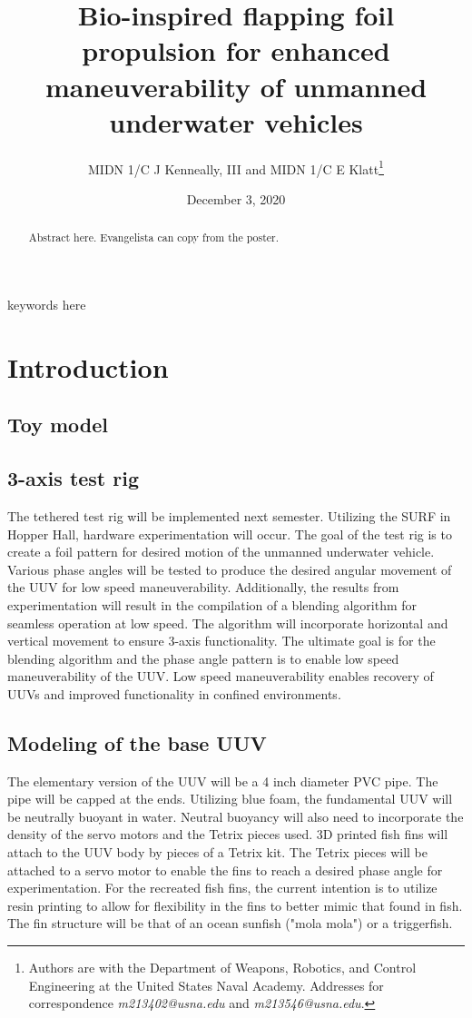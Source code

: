 \documentclass[twocolumn,10pt]{IEEEtran}
\title{Bio-inspired flapping foil propulsion for enhanced maneuverability of unmanned underwater vehicles}
\author{MIDN 1/C J Kenneally, III and MIDN 1/C E Klatt\thanks{Authors are with the Department of Weapons, Robotics, and Control Engineering at the United States Naval Academy. Addresses for correspondence \emph{m213402@usna.edu} and \emph{m213546@usna.edu}.}}
\date{December 3, 2020}
\begin{document}
\maketitle
\begin{abstract}
    Abstract here. Evangelista can copy from the poster. 
\end{abstract}

\begin{IEEEkeywords}
keywords here
\end{IEEEkeywords}


\section{Introduction}
\subsection{Toy model}
\subsection{3-axis test rig}
The tethered test rig will be implemented next semester.  Utilizing the SURF in Hopper Hall, hardware experimentation will occur.  The goal of the test rig is to create a foil pattern for desired motion of the unmanned underwater vehicle.  Various phase angles will be tested to produce the desired angular movement of the UUV for low speed maneuverability.  Additionally, the results from experimentation will result in the compilation of a blending algorithm for seamless operation at low speed.  The algorithm will incorporate horizontal and vertical movement to ensure 3-axis functionality.  The ultimate goal is for the blending algorithm and the phase angle pattern is to enable low speed maneuverability of the UUV.  Low speed maneuverability enables recovery of UUVs and improved functionality in confined environments.  

\subsection{Modeling of the base UUV}
The elementary version of the UUV will be a 4 inch diameter PVC pipe.  The pipe will be capped at the ends.  Utilizing blue foam, the fundamental UUV will be neutrally buoyant in water.  Neutral buoyancy will also need to incorporate the density of the servo motors and the Tetrix pieces used.  3D printed fish fins will attach to the UUV body by pieces of a Tetrix kit.  The Tetrix pieces will be attached to a servo motor to enable the fins to reach a desired phase angle for experimentation.  For the recreated fish fins, the current intention is to utilize resin printing to allow for flexibility in the fins to better mimic that found in fish.  The fin structure will be that of an ocean sunfish ("mola mola") or a triggerfish. 
 
\end{document}
